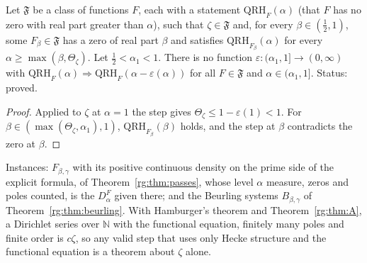 \begin{proposition}\label{rg:prop:class}
Let $\mathfrak F$ be a class of functions $F$, each with a statement $\mathrm{QRH}_F(\alpha)$ (that $F$ has no zero with real part greater than $\alpha$), such that $\zeta\in\mathfrak F$ and, for every $\beta\in(\frac12,1)$, some $F_\beta\in\mathfrak F$ has a zero of real part $\beta$ and satisfies $\mathrm{QRH}_{F_\beta}(\alpha)$ for every $\alpha\ge\max(\beta,\Theta_\zeta)$. Let $\frac12<\alpha_1<1$. There is no function $\varepsilon:(\alpha_1,1]\to(0,\infty)$ with $\mathrm{QRH}_F(\alpha)\Rightarrow\mathrm{QRH}_F(\alpha-\varepsilon(\alpha))$ for all $F\in\mathfrak F$ and $\alpha\in(\alpha_1,1]$. Status: proved.
\end{proposition}

\begin{proof}
Applied to $\zeta$ at $\alpha=1$ the step gives $\Theta_\zeta\le1-\varepsilon(1)<1$. For $\beta\in(\max(\Theta_\zeta,\alpha_1),1)$, $\mathrm{QRH}_{F_\beta}(\beta)$ holds, and the step at $\beta$ contradicts the zero at $\beta$.
\end{proof}

Instances: $F_{\beta,\gamma}$ with its positive continuous density on the prime side of the explicit formula, of Theorem~\ref{rg:thm:passes}, whose level $\alpha$ measure, zeros and poles counted, is the $D^F_\alpha$ given there; and the Beurling systems $B_{\beta,\gamma}$ of Theorem~\ref{rg:thm:beurling}. With Hamburger's theorem \cite{NCHamburger21} and Theorem~\ref{rg:thm:A}, a Dirichlet series over $\mathbb N$ with the functional equation, finitely many poles and finite order is $c\zeta$, so any valid step that uses only Hecke structure and the functional equation is a theorem about $\zeta$ alone.

